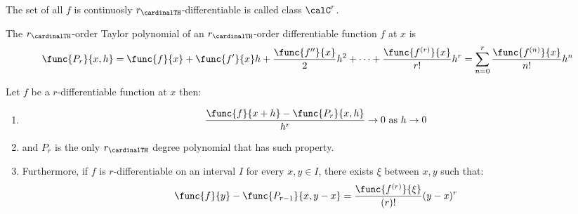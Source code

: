 \begin{definition}
    The set of all \(f\) is continuosly \(r_{\cardinalTH}\)-differentiable is called class \(\calC^r\).
\end{definition}
\begin{definition}
    The \(r_{\cardinalTH}\)-order Taylor polynomial of an \(r_{\cardinalTH}\)-order differentiable function \(f\) at \(x\) is
    \begin{equation*}
        \func{P_r}{x,h} =\func{f}{x} + \func{f'}{x}h +  \dfrac{\func{f''}{x}}{2}h^2 + \dots +  \dfrac{\func{f^{(r)}}{x}}{r!} h^r = \sum_{n = 0}^{r}\dfrac{\func{f^{(n)}}{x}}{n!} h^n
    \end{equation*}
\end{definition}
\begin{theorem}
    Let \(f\) be a \(r\)-differentiable function at \(x\) then:
    \begin{enumerate}
        \item
              \begin{equation*}
                  \dfrac{\func{f}{x+h} - \func{P_r}{x,h}}{h^r} \to 0 \text{ as } h \to 0
              \end{equation*}
        \item
              and \(P_r\) is the only \(r_{\cardinalTH}\) degree polynomial that has such property.
        \item
              Furthermore, if \(f\) is \(r\)-differentiable on an interval \(I\) for every \(x,y \in I\), there exists \(\xi\) between \(x,y\) such that:
              \begin{equation*}
                  \func{f}{y} - \func{P_{r-1}}{x,y-x} = \dfrac{\func{f^{(r)}}{\xi }}{(r)!}(y-x)^{r}
              \end{equation*}
    \end{enumerate}
\end{theorem}
